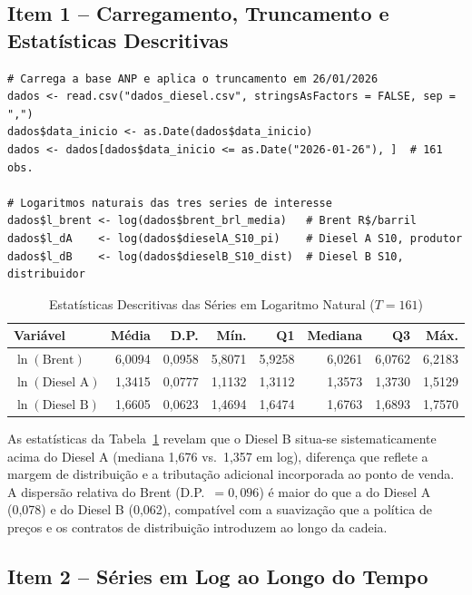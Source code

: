 \documentclass[12pt,a4paper]{article}
\begin{document}
\subsection{Item 1 -- Carregamento, Truncamento e Estatísticas Descritivas}

\begin{lstlisting}[caption={Carregamento, truncamento e criação das variáveis em log}]
# Carrega a base ANP e aplica o truncamento em 26/01/2026
dados <- read.csv("dados_diesel.csv", stringsAsFactors = FALSE, sep = ",")
dados$data_inicio <- as.Date(dados$data_inicio)
dados <- dados[dados$data_inicio <= as.Date("2026-01-26"), ]  # 161 obs.

# Logaritmos naturais das tres series de interesse
dados$l_brent <- log(dados$brent_brl_media)   # Brent R$/barril
dados$l_dA    <- log(dados$dieselA_S10_pi)    # Diesel A S10, produtor
dados$l_dB    <- log(dados$dieselB_S10_dist)  # Diesel B S10, distribuidor
\end{lstlisting}

\begin{table}[H]
\centering
\caption{Estatísticas Descritivas das Séries em Logaritmo Natural ($T = 161$)}
\label{tab:desc}
\begin{tabular}{lrrrrrrr}
\toprule
Variável & Média & D.P. & Mín. & Q1 & Mediana & Q3 & Máx. \\
\midrule
$\ln(\text{Brent})$ & 6,0094 & 0,0958 & 5,8071 & 5,9258 & 6,0261 & 6,0762 & 6,2183 \\
$\ln(\text{Diesel A})$ & 1,3415 & 0,0777 & 1,1132 & 1,3112 & 1,3573 & 1,3730 & 1,5129 \\
$\ln(\text{Diesel B})$ & 1,6605 & 0,0623 & 1,4694 & 1,6474 & 1,6763 & 1,6893 & 1,7570 \\
\bottomrule
\end{tabular}
\end{table}

\noindent
As estatísticas da Tabela~\ref{tab:desc} revelam que o Diesel B situa-se
sistematicamente acima do Diesel A (mediana 1,676 vs.\ 1,357 em log),
diferença que reflete a margem de distribuição e a tributação adicional
incorporada ao ponto de venda.
A dispersão relativa do Brent (D.P.\ $= 0,096$) é maior do que a do
Diesel A (0,078) e do Diesel B (0,062), compatível com a suavização
que a política de preços e os contratos de distribuição introduzem
ao longo da cadeia.

\subsection{Item 2 -- Séries em Log ao Longo do Tempo}
\end{document}
